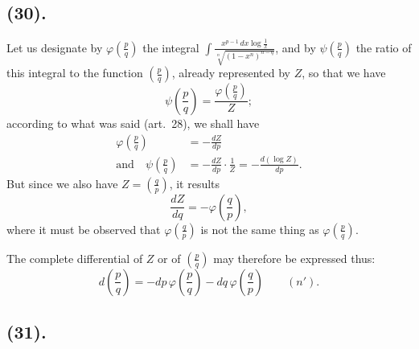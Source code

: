 \documentclass{article}
\begin{document}
\subsection*{(30).}

Let us designate by $\varphi\left(\frac{p}{q}\right)$ the integral $\displaystyle\int\frac{x^{p-1}\,dx\log\frac{1}{x}}{\sqrt[n]{(1-x^{n})^{n-q}}}$, and by $\psi\left(\frac{p}{q}\right)$ the ratio of this integral to the function $\left(\frac{p}{q}\right)$, already represented by $Z$, so that we have
\[ \psi\left(\frac{p}{q}\right)=\frac{\varphi\left(\frac{p}{q}\right)}{Z}; \]
according to what was said (art.~28), we shall have
\[ \begin{aligned} \varphi\left(\frac{p}{q}\right)&=-\frac{dZ}{dp}\\ \text{and}\quad\psi\left(\frac{p}{q}\right)&=-\frac{dZ}{dp}\cdot\frac{1}{Z}=-\frac{d(\log Z)}{dp}. \end{aligned} \]
But since we also have $Z=\left(\frac{q}{p}\right)$, it results
\[ \frac{dZ}{dq}=-\varphi\left(\frac{q}{p}\right), \]
where it must be observed that $\varphi\left(\frac{q}{p}\right)$ is not the same thing as $\varphi\left(\frac{p}{q}\right)$.


The complete differential of $Z$ or of $\left(\frac{p}{q}\right)$ may therefore be expressed thus:
\[ d\left(\frac{p}{q}\right)=-dp\,\varphi\left(\frac{p}{q}\right)-dq\,\varphi\left(\frac{q}{p}\right)\qquad(n'). \]

\subsection*{(31).}
\end{document}
